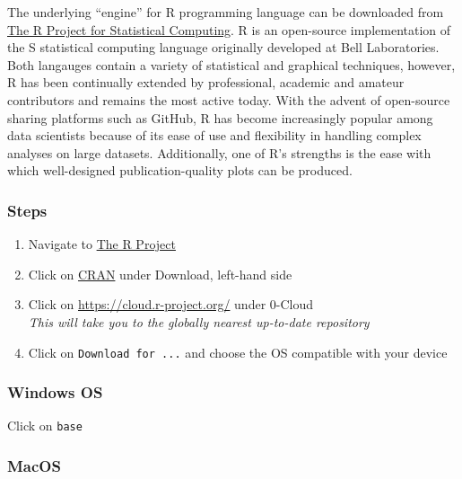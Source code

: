 \documentclass[
]{book}
\providecommand{\tightlist}{%
  \setlength{\itemsep}{0pt}\setlength{\parskip}{0pt}}
\begin{document}
The underlying ``engine'' for R programming language can be downloaded from \href{https://www.r-project.org/}{The R Project for Statistical Computing}. R is an open-source implementation of the S statistical computing language originally developed at Bell Laboratories. Both langauges contain a variety of statistical and graphical techniques, however, R has been continually extended by professional, academic and amateur contributors and remains the most active today. With the advent of open-source sharing platforms such as GitHub, R has become increasingly popular among data scientists because of its ease of use and flexibility in handling complex analyses on large datasets. Additionally, one of R's strengths is the ease with which well-designed publication-quality plots can be produced.

\hypertarget{steps}{%
\subsubsection*{Steps}\label{steps}}

\begin{enumerate}
\def\labelenumi{\arabic{enumi}.}
\tightlist
\item
  Navigate to \href{https://www.r-project.org/}{The R Project}
\item
  Click on \href{https://cran.r-project.org/mirrors.html}{CRAN} under Download, left-hand side
\item
  Click on \url{https://cloud.r-project.org/} under 0-Cloud\\
  \emph{This will take you to the globally nearest up-to-date repository}
\item
  Click on \texttt{Download\ for\ ...} and choose the OS compatible with your device
\end{enumerate}

\hypertarget{windows-os}{%
\subsubsection*{Windows OS}\label{windows-os}}

Click on \texttt{base}

\hypertarget{macos}{%
\subsubsection*{MacOS}\label{macos}}
\end{document}
